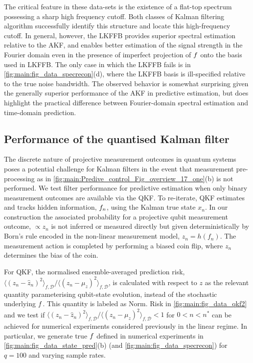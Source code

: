 The critical feature in these data-sets is the existence of a flat-top spectrum possessing a sharp high frequency cutoff.  Both classes of Kalman filtering algorithm successfully identify this structure and locate this high-frequency cutoff.  In general, however, the LKFFB provides superior spectral estimation relative to the AKF, and enables better estimation of the signal strength in the Fourier domain even in the presence of imperfect projection of $f$ onto the basis used in LKFFB.  The only case in which the LKFFB fails is in \cref{fig:main:fig_data_specrecon}(d), where the LKFFB basis is ill-specified relative to the true noise bandwidth. The observed behavior is somewhat surprising given the generally superior performance of the AKF in predictive estimation, but does highlight the practical difference between Fourier-domain spectral estimation and time-domain prediction. 


\subsection{Performance of the quantised Kalman filter}
The discrete nature of projective measurement outcomes in quantum systems poses a potential challenge for Kalman filters in the event that measurement pre-processing as in \cref{fig:main:Predive_control_Fig_overview_17_one}(b) is not performed.  We test filter performance for predictive estimation when only binary measurement outcomes are available via the QKF.  To re-iterate, QKF estimates and tracks hidden information, $f_n$, using the Kalman true state $x_n$.  In our construction the associated probability for a projective qubit measurement outcome, $\propto z_n$ is not inferred or measured directly but given deterministically by Born's rule encoded in the non-linear measurement model, $z_n = h(f_n)$. The measurement action is completed by performing a biased coin flip, where $z_n$ determines the bias of the coin.  

For QKF, the normalised ensemble-averaged prediction risk, $ \langle (z_n - \hat{z}_n)^2 \rangle_{f, \mathcal{D}} / \langle (z_n - \mu_z)^2 \rangle_{f, \mathcal{D}}$, is calculated with respect to $z$ as the relevant quantity parameterising qubit-state evolution, instead of the stochastic underlying $f$. This quantity is labeled as Norm. Risk in \cref{fig:main:fig_data_qkf2} and we test if $ \langle (z_n - \hat{z}_n)^2 \rangle_{f, \mathcal{D}} / \langle (z_n - \mu_z)^2 \rangle_{f, \mathcal{D}} < 1$ for $0< n < n^*$ can be achieved for numerical experiments considered previously in the linear regime. In particular, we generate true $f$ defined in numerical experiments in \cref{fig:main:fig_data_state_pred}(b) (and \cref{fig:main:fig_data_specrecon}) for $q=100$ and varying sample rates.


